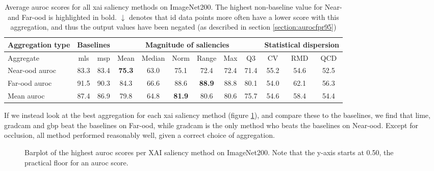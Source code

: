 \documentclass[UKenglish]{uiomasterthesis} %
\theoremstyle{definition}
\begin{document}
\begin{table}[H]
\setlength\tabcolsep{3pt}
\begin{center}
\begin{tabular}{ |p{5.1em}|c c|c c c c c c|c c c| }
    \hline
     \centering Aggregation type & \multicolumn{2}{c|}{Baselines} & \multicolumn{6}{c|}{Magnitude of saliencies} & \multicolumn{3}{p{8em}|}{\centering Statistical dispersion} \\
    \hline
    Aggregate & \ac{mls} & \ac{msp} & Mean & Median & Norm & Range & Max & Q3 & CV & RMD & QCD  \\
    \hline
    \rowcolor{near!50}
    Near-\ac{ood} \ac{auroc} & 83.3 & 83.4 &\textbf{ 75.3 }& 63.0 & 75.1 & 72.4 & 72.4 & 71.4 & 55.2 & 54.6 & 52.5  \\
    \hline
    \rowcolor{far!50}
    Far-\ac{ood} \ac{auroc} & 91.5 & 90.3 & 84.3 & 66.6 & 88.6 &\textbf{ 88.9 }& 88.8 & 80.1 & 54.0 & 62.1 & 56.3  \\
    \hline
    Mean \ac{auroc} & 87.4 & 86.9 & 79.8 & 64.8 &\textbf{ 81.9 }& 80.6 & 80.6 & 75.7 & 54.6 & 58.4 & 54.4  \\
    \hline
    \end{tabular}
    \caption[Average \ac{auroc} scores over all \ac{xai} saliency methods on ImageNet200]{Average \ac{auroc} scores for all \ac{xai} saliency methods on ImageNet200. The highest non-baseline value for Near- and Far-\ac{ood} is highlighted in bold. $\downarrow$ denotes that \ac{id} data points more often have a lower score with this aggregation, and thus the output values have been negated (as described in section \ref{section:aurocfpr95})}
    \label{table:imagenet200_all_metrics}
\end{center}
\setlength\tabcolsep{6pt}
\end{table}

If we instead look at the best aggregation for each \ac{xai} saliency method (figure \ref{fig:imagenet200_all_generators_barplot}), and compare these to the baselines, we find that \ac{lime}, \ac{gradcam} and \ac{gbp} beat the baselines on Far-\ac{ood}, while \ac{gradcam} is the only method who beats the baselines on Near-\ac{ood}. Except for occlusion, all method performed reasonably well, given a correct choice of aggregation.

\begin{figure}[H]
    \begin{center}
        
    \end{center}
    \caption[Average scores]{Barplot of the highest \ac{auroc} scores per XAI saliency method on ImageNet200. Note that the y-axis starts at 0.50, the practical floor for an \ac{auroc} score.}
    \label{fig:imagenet200_all_generators_barplot}
\end{figure}
\end{document}

